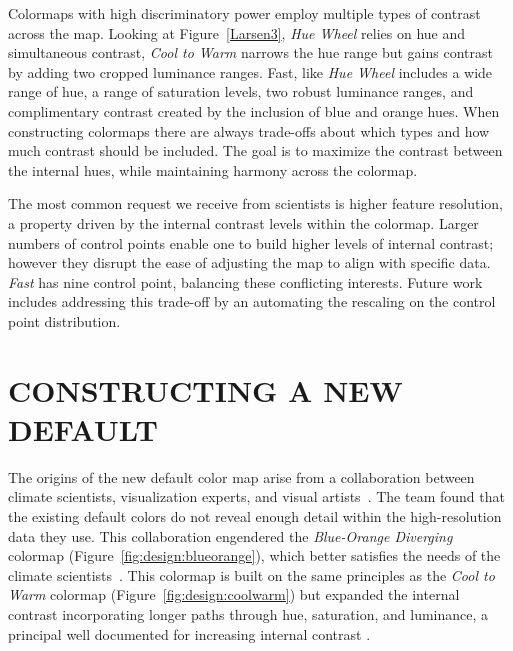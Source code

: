 \documentclass{IEEEcsmag}
\newcommand*{\colormap}[1]{\textsl{#1}\xspace}
\newcommand*{\huewheel}{\colormap{Hue Wheel}}
\newcommand*{\coolwarm}{\colormap{Cool to Warm}}
\newcommand*{\blueorange}{\colormap{Blue-Orange Diverging}}
\newcommand*{\fast}{\colormap{Fast}}
\begin{document}
Colormaps with high discriminatory power employ multiple types of contrast across the map.
Looking at Figure~\ref{Larsen3}, \huewheel relies on hue and simultaneous contrast, \coolwarm narrows the hue range but gains contrast by adding two cropped luminance ranges.
Fast, like \huewheel includes a wide range of hue, a range of saturation levels, two robust luminance ranges, and complimentary contrast created by the inclusion of blue and orange hues.
When constructing colormaps there are always trade-offs about which types and how much contrast should be included.
The goal is to maximize the contrast between the internal hues, while maintaining harmony across the colormap.





The most common request we receive from scientists is higher feature resolution, a property driven by the internal contrast levels within the colormap.
Larger numbers of control points enable one to build higher levels of internal contrast; however they disrupt the ease of adjusting the map to align with specific data.
\fast has nine control point, balancing these conflicting interests.
Future work includes addressing this trade-off by an automating the rescaling on the control point distribution.



\section{CONSTRUCTING A NEW DEFAULT}
The origins of the new default color map arise from a collaboration between climate scientists, visualization experts, and visual artists~\cite{Samsel2015}.
The team found that the existing default colors do not reveal enough detail within the high-resolution data they use.
This collaboration engendered the \blueorange colormap (Figure~\ref{fig:design:blueorange}), which better satisfies the needs of the climate scientists~\cite{Samsel2015:SC}.
This colormap is built on the same principles as the \coolwarm colormap (Figure~\ref{fig:design:coolwarm}) but expanded the internal contrast incorporating longer paths through hue, saturation, and luminance, a principal well documented for increasing internal contrast \cite{Ware2023}.
\end{document}
